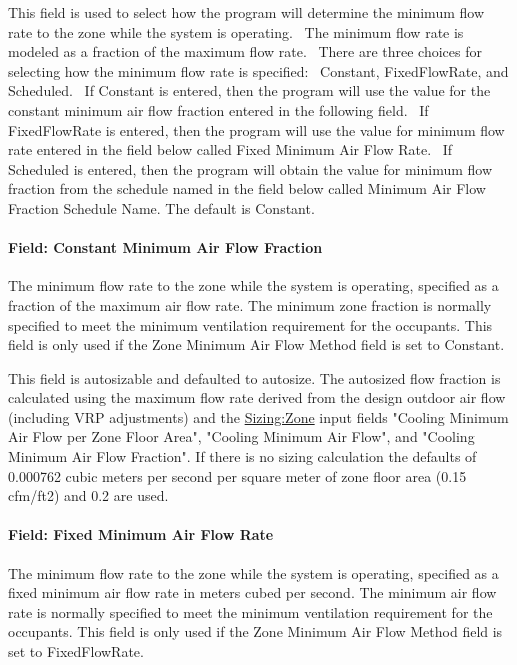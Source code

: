 This field is used to select how the program will determine the minimum flow rate to the zone while the system is operating.~ The minimum flow rate is modeled as a fraction of the maximum flow rate.~ There are three choices for selecting how the minimum flow rate is specified:~ Constant, FixedFlowRate, and Scheduled.~ If Constant is entered, then the program will use the value for the constant minimum air flow fraction entered in the following field.~ If FixedFlowRate is entered, then the program will use the value for minimum flow rate entered in the field below called Fixed Minimum Air Flow Rate.~ If Scheduled is entered, then the program will obtain the value for minimum flow fraction from the schedule named in the field below called Minimum Air Flow Fraction Schedule Name. The default is Constant.

\paragraph{Field: Constant Minimum Air Flow Fraction}\label{field-constant-minimum-air-flow-fraction-1}

The minimum flow rate to the zone while the system is operating, specified as a fraction of the maximum air flow rate. The minimum zone fraction is normally specified to meet the minimum ventilation requirement for the occupants. This field is only used if the Zone Minimum Air Flow Method field is set to Constant.

This field is autosizable and defaulted to autosize. The autosized flow fraction is calculated using the maximum flow rate derived from the design outdoor air flow (including VRP adjustments) and the \hyperref[sizingzone]{Sizing:Zone} input fields "Cooling Minimum Air Flow per Zone Floor Area", "Cooling Minimum Air Flow", and "Cooling Minimum Air Flow Fraction". If there is no sizing calculation the defaults of 0.000762 cubic meters per second per square meter of zone floor area (0.15 cfm/ft2) and 0.2 are used.

\paragraph{Field: Fixed Minimum Air Flow Rate}\label{field-fixed-minimum-air-flow-rate-1}

The minimum flow rate to the zone while the system is operating, specified as a fixed minimum air flow rate in meters cubed per second. The minimum air flow rate is normally specified to meet the minimum ventilation requirement for the occupants. This field is only used if the Zone Minimum Air Flow Method field is set to FixedFlowRate.

